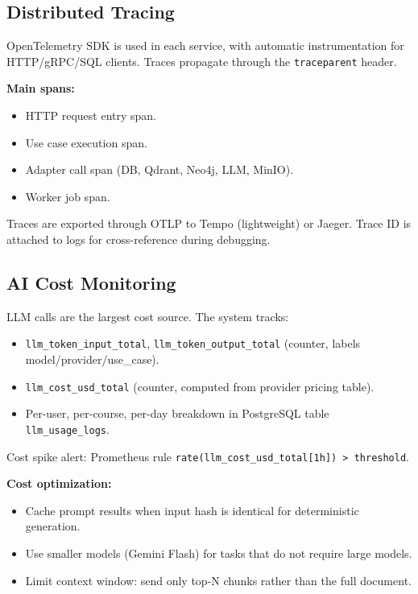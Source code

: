 \subsection{Distributed Tracing}

OpenTelemetry SDK is used in each service, with automatic instrumentation
for HTTP/gRPC/SQL clients. Traces propagate through the
\texttt{traceparent} header.

\textbf{Main spans:}
\begin{itemize}
    \item HTTP request entry span.
    \item Use case execution span.
    \item Adapter call span (DB, Qdrant, Neo4j, LLM, MinIO).
    \item Worker job span.
\end{itemize}

Traces are exported through OTLP to Tempo (lightweight) or Jaeger. Trace
ID is attached to logs for cross-reference during debugging.

\subsection{AI Cost Monitoring}

LLM calls are the largest cost source. The system tracks:

\begin{itemize}
    \item \texttt{llm\_token\_input\_total}, \texttt{llm\_token\_output\_total}
          (counter, labels model/provider/use\_case).
    \item \texttt{llm\_cost\_usd\_total} (counter, computed from provider
          pricing table).
    \item Per-user, per-course, per-day breakdown in PostgreSQL table
          \texttt{llm\_usage\_logs}.
\end{itemize}

Cost spike alert: Prometheus rule
\texttt{rate(llm\_cost\_usd\_total[1h]) > threshold}.

\textbf{Cost optimization:}
\begin{itemize}
    \item Cache prompt results when input hash is identical for
          deterministic generation.
    \item Use smaller models (Gemini Flash) for tasks that do not require
          large models.
    \item Limit context window: send only top-N chunks rather than the
          full document.
\end{itemize}


